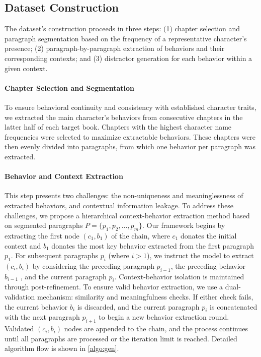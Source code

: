 \subsection{Dataset Construction}
The dataset's construction proceeds in three steps: (1) chapter selection and paragraph segmentation based on the frequency of a representative character's presence; (2) paragraph-by-paragraph extraction of behaviors and their corresponding contexts; and (3) distractor generation for each behavior within a given context.


\paragraph{Chapter Selection and Segmentation}

To ensure behavioral continuity and consistency with established character traits, we extracted the main character's behaviors from consecutive chapters in the latter half of each target book.  
Chapters with the highest character name frequencies were selected to maximize extractable behaviors.  
These chapters were then evenly divided into paragraphs, from which one behavior per paragraph was extracted.


\paragraph{Behavior and Context Extraction}


This step presents two challenges: the non-uniqueness and meaninglessness of extracted behaviors, and contextual information leakage. 
To address these challenges, we propose a hierarchical context-behavior extraction method based on segmented paragraphs $P = \{p_1, p_2, ..., p_m\}$.
Our framework begins by extracting the first node ${(c_1, b_1)}$ of the chain, where $c_1$ donates the initial context and  $b_1$ donates the most key behavior extracted from the first paragraph $p_1$.
For subsequent paragraphs $p_i$ (where $i > 1$), we instruct the model to extract $(c_i, b_i)$ by considering the preceding paragraph $p_{i-1}$, the preceding behavior $b_{i-1}$ , and the current paragraph $p_i$.  
Context-behavior isolation is maintained through post-refinement.
To ensure valid behavior extraction, we use a dual-validation mechanism: similarity and meaningfulness checks.
If either check fails, the current behavior $b_i$ is discarded, and the current paragraph $p_{i}$ is concatenated with the next paragraph $p_{i+1}$ to begin a new behavior extraction round.  
Validated $(c_i, b_i)$ nodes are appended to the chain, and the process continues until all paragraphs are processed or the iteration limit is reached.
Detailed algorithm flow is shown in \ref{algo:gen}.


